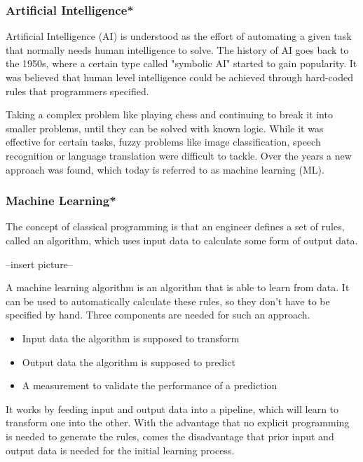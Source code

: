 \subsubsection{Artificial Intelligence*}

Artificial Intelligence (AI) is understood as the effort of automating a given task that normally needs human intelligence to solve\cite{Chollet2017}. The history of AI goes back to the 1950s, where a certain type called "symbolic AI" started to gain popularity. It was believed that human level intelligence could be achieved through hard-coded rules that programmers specified. 

Taking a complex problem like playing chess and continuing to break it into smaller problems, until they can be solved with known logic. While it was effective for certain tasks, fuzzy problems like image classification, speech recognition or language translation were difficult to tackle. Over the years a new approach was found, which today is referred to as machine learning (ML).

\subsubsection{Machine Learning*}

The concept of classical programming is that an engineer defines a set of rules, called an algorithm, which uses input data to calculate some form of output data\cite{Chollet2017}.

--insert picture--

A machine learning algorithm is an algorithm that is able to learn from data\cite{Goodfellow2016}. It can be used to automatically calculate these rules, so they don't have to be specified by hand. Three components are needed for such an approach.

\begin{itemize}
\item Input data the algorithm is supposed to transform
\item Output data the algorithm is supposed to predict
\item A measurement to validate the performance of a prediction
\end{itemize}

It works by feeding input and output data into a pipeline, which will learn to transform one into the other. With the advantage that no explicit programming is needed to generate the rules, comes the disadvantage that prior input and output data is needed for the initial learning process.


